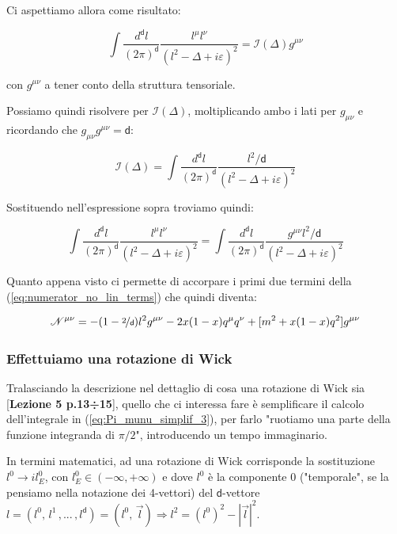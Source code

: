 \documentclass[../main.tex]{subfiles}
\begin{document}
Ci aspettiamo allora come risultato:

\[
\int \frac{d^\mathsf{d} l}{(2\pi)^\mathsf{d}} \frac{l^\mu l^\nu}{(l^2 - \Delta + i\varepsilon)^2} = \mathscr{I}(\Delta)g^{\mu\nu}
\]

con $g^{\mu\nu}$ a tener conto della struttura tensoriale.

Possiamo quindi risolvere per $\mathscr{I}(\Delta)$, moltiplicando ambo i lati per $g_{\mu\nu}$ e ricordando che $g_{\mu\nu}g^{\mu\nu}=\mathsf d$:

\[
\mathscr{I}(\Delta) = \int \frac{d^\mathsf{d} l}{(2\pi)^\mathsf{d}} \frac{l^2/\mathsf d}{(l^2 - \Delta + i\varepsilon)^2}
\]

Sostituendo nell'espressione sopra troviamo quindi:

\begin{equation}
    \boxed{\int \frac{d^\mathsf{d} l}{(2\pi)^\mathsf{d}} \frac{l^\mu l^\nu}{(l^2 - \Delta + i\varepsilon)^2} = \int \frac{d^\mathsf{d} l}{(2\pi)^\mathsf{d}} \frac{{g^{\mu\nu}l^2}/\mathsf d}{(l^2 - \Delta + i\varepsilon)^2}}
    \label{eq:tensor_reduction}
\end{equation}

Quanto appena visto ci permette di accorpare i primi due termini della (\ref{eq:numerator_no_lin_terms}) che quindi diventa:

\begin{equation}
    \mathscr{N}^{\mu\nu} = -(1 - \nicefrac{2}{\mathsf d}) l^2g^{\mu\nu} - 2x(1-x)q^\mu q^\nu + [m^2 + x(1-x)q^2] g^{\mu\nu}
    \label{eq:numerator_tensor_red}
\end{equation}

\subsubsection{Effettuiamo una rotazione di Wick}
Tralasciando la descrizione nel dettaglio di cosa una rotazione di Wick sia [\textbf{Lezione 5 p.13÷15}], quello che ci interessa fare è semplificare il calcolo dell'integrale in (\ref{eq:Pi_munu_simplif_3}), per farlo "ruotiamo una parte della funzione integranda di ${\pi}/{2}$", introducendo un tempo immaginario.

In termini matematici, ad una rotazione di Wick corrisponde la sostituzione $\boxed{l^0\rightarrow il^0_E}$, con $l^0_E\in(-\infty,+\infty)$ e dove $l^0$ è la componente 0 ("temporale", se la pensiamo nella notazione dei 4-vettori) del $\mathsf d$-vettore $l = (l^0,\,l^1\,,...\,,l^\mathsf d ) = (l^0,\,\Vec{l} ) \Rightarrow l^2=({l^0})^2-|\Vec{l}|^2$.
\end{document}
